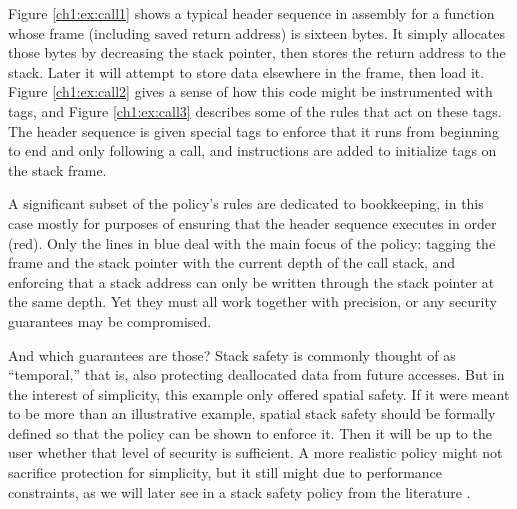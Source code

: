 Figure \ref{ch1:ex:call1} shows a typical header sequence in assembly for a function whose frame
(including saved return address) is sixteen bytes. It simply allocates those bytes by decreasing
the stack pointer, then stores the return address to the stack. Later it will attempt to store data
elsewhere in the frame, then load it. Figure \ref{ch1:ex:call2} gives a sense of how
this code might be instrumented with tags, and Figure \ref{ch1:ex:call3} describes some of
the rules that act on these tags. The header sequence is given special tags to enforce
that it runs from beginning to end and only following a call, and instructions are added
to initialize tags on the stack frame.

A significant subset of the policy's rules are dedicated to bookkeeping, in this case
mostly for purposes of ensuring that the header sequence executes in order (red).
Only the lines in blue deal with the main focus of the policy:
tagging the frame and the stack pointer with the current depth of the call stack, and enforcing
that a stack address can only be written through the stack pointer at the same depth.
Yet they must all work together with precision, or any security guarantees may be compromised.

And which guarantees are those? Stack safety is commonly thought of as ``temporal,'' that is,
also protecting deallocated data from future accesses. But in the interest of simplicity,
this example only offered spatial safety. If it were meant to be more than an illustrative
example, spatial stack safety should be formally defined so that the policy can be shown
to enforce it. Then it will be up to the user whether that level of security is sufficient.
A more realistic policy might not sacrifice protection for simplicity, but it still might due to
performance constraints, as we will later see in a stack safety policy from the
literature \cite{RoesslerD18}.

